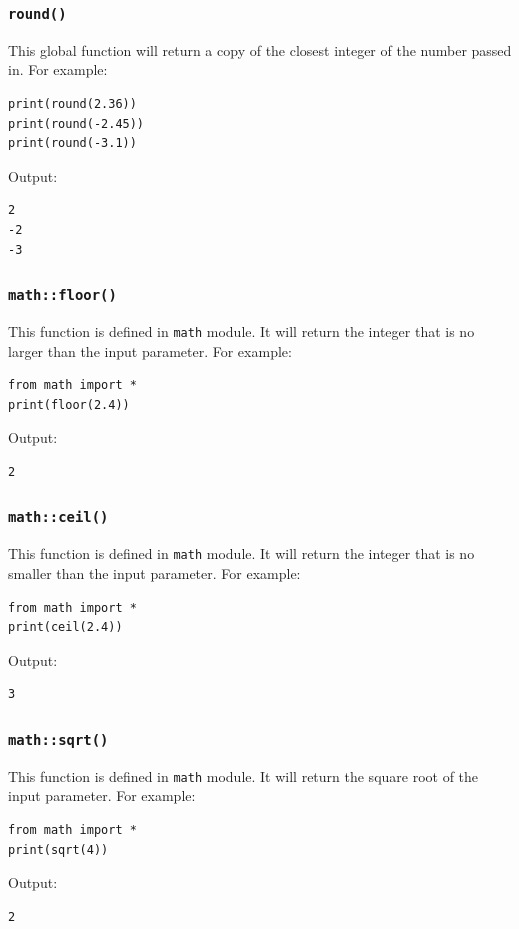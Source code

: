 \documentclass[12pt]{book}
\begin{document}
\subsubsection{\texttt{round()}}
\label{sec:orgd04a0c1}
This global function will return a copy of the closest integer of the number passed in. For example:
\begin{verbatim}
print(round(2.36))
print(round(-2.45))
print(round(-3.1))
\end{verbatim}
Output:
\begin{verbatim}
2
-2
-3
\end{verbatim}

\subsubsection{\texttt{math::floor()}}
\label{sec:org51b2f27}
This function is defined in \texttt{math} module. It will return the integer that is no larger than the input parameter. For example:
\begin{verbatim}
from math import *
print(floor(2.4))
\end{verbatim}
Output:
\begin{verbatim}
2
\end{verbatim}

\subsubsection{\texttt{math::ceil()}}
\label{sec:org234ec09}
This function is defined in \texttt{math} module. It will return the integer that is no smaller than the input parameter. For example:
\begin{verbatim}
from math import *
print(ceil(2.4))
\end{verbatim}
Output:
\begin{verbatim}
3
\end{verbatim}

\subsubsection{\texttt{math::sqrt()}}
\label{sec:org46fb3f7}
This function is defined in \texttt{math} module. It will return the square root of the input parameter. For example:
\begin{verbatim}
from math import *
print(sqrt(4))
\end{verbatim}
Output:
\begin{verbatim}
2
\end{verbatim}
\end{document}
